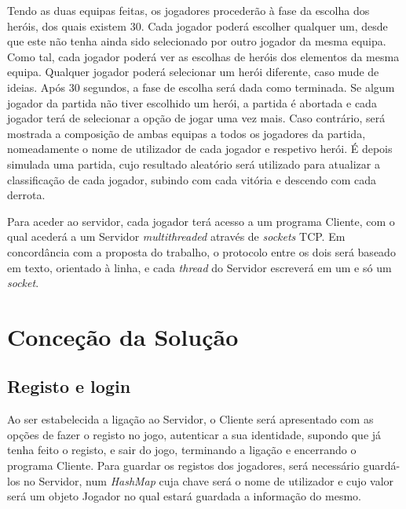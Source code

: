 \documentclass[a4paper]{article}
\begin{document}
\par Tendo as duas equipas feitas, os jogadores procederão à fase da escolha dos heróis, dos quais existem 30. Cada jogador poderá escolher qualquer um, desde que este não tenha ainda sido selecionado por outro jogador da mesma equipa. Como tal, cada jogador poderá ver as escolhas de heróis dos elementos da mesma equipa. Qualquer jogador poderá selecionar um herói diferente, caso mude de ideias. Após 30 segundos, a fase de escolha será dada como terminada. Se algum jogador da partida não tiver escolhido um herói, a partida é abortada e cada jogador terá de selecionar a opção de jogar uma vez mais. Caso contrário, será mostrada a composição de ambas equipas a todos os jogadores da partida, nomeadamente o nome de utilizador de cada jogador e respetivo herói. É depois simulada uma partida, cujo resultado aleatório será utilizado para atualizar a classificação de cada jogador, subindo com cada vitória e descendo com cada derrota.

\par Para aceder ao servidor, cada jogador terá acesso a um programa Cliente, com o qual acederá a um Servidor \textit{multithreaded} através de \textit{sockets} TCP. Em concordância com a proposta do trabalho, o protocolo entre os dois será baseado em texto, orientado à linha, e cada \textit{thread} do Servidor escreverá em um e só um \textit{socket}.


\pagebreak
\clearpage

\section{Conceção da Solução}
\label{sec:3}

\subsection{Registo e login}
\label{sec:3.1}

\hspace{3mm} Ao ser estabelecida a ligação ao Servidor, o Cliente será apresentado com as opções de fazer o registo no jogo, autenticar a sua identidade, supondo que já tenha feito o registo, e sair do jogo, terminando a ligação e encerrando o programa Cliente. Para guardar os registos dos jogadores, será necessário guardá-los no Servidor, num \textit{HashMap} cuja chave será o nome de utilizador e cujo valor será um objeto Jogador no qual estará guardada a informação do mesmo.
\end{document}
